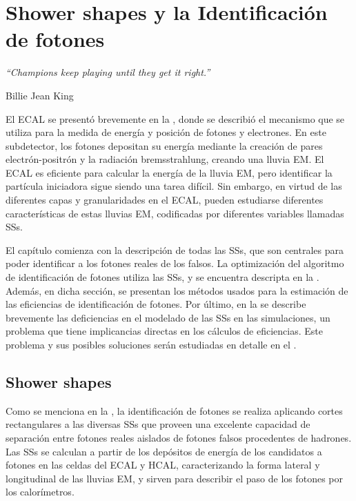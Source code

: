 \chapter{Shower shapes y la Identificaci\'on de fotones}
\label{ch:pid_ss}
\epigraph{\emph{“Champions keep playing until they get it right.”}}{Billie Jean King}



El \ac{ECAL} se presentó brevemente en la \Sect{\ref{subsubsec:atlas:atlas:cals:ecal}}, donde se describió el mecanismo que se utiliza para la medida de energ\'ia y posici\'on de fotones y electrones. En este subdetector, los fotones depositan su energía mediante la creación de pares electrón-positrón y la radiación bremsstrahlung, creando una lluvia \acf{EM}. El \ac{ECAL} es eficiente para calcular la energía de la lluvia \ac{EM}, pero identificar la partícula iniciadora sigue siendo una tarea difícil.
Sin embargo, en virtud de las diferentes capas y granularidades en el \ac{ECAL}, pueden estudiarse diferentes características de estas lluvias \ac{EM}, codificadas por diferentes variables llamadas \acfp{SS}.

El cap\'itulo comienza con la descripci\'on de todas las \acp{SS}, que son centrales para poder identificar a los fotones reales de los falsos.
La optimizaci\'on del algoritmo de identificaci\'on de fotones utiliza las \acp{SS}, y se encuentra descripta en la \Sect{\ref{sec:pid_ss:pid}}. Adem\'as, en dicha secci\'on, se presentan los m\'etodos usados para la estimaci\'on de las eficiencias de identificaci\'on de fotones.
Por último, en la \Sect{\ref{sec:pid_ss:ss_differences}} se describe brevemente las deficiencias en el modelado de las \acp{SS} en las simulaciones, un problema que tiene implicancias directas en los c\'alculos de eficiencias. Este problema y sus posibles soluciones ser\'an estudiadas en detalle en el \Ch{\ref{ch:ss_corrections}}.






\section{Shower shapes}
\label{sec:pid_ss:ss}

Como se menciona en la \Sect{\ref{subsec:objects:egamma:id}}, la identificación de fotones se realiza aplicando cortes rectangulares a las diversas \acp{SS} que proveen una excelente capacidad de separación entre fotones reales aislados de fotones falsos procedentes de hadrones. Las \acp{SS} se calculan a partir de los depósitos de energía de los candidatos a fotones en las celdas del \ac{ECAL} y \ac{HCAL}, caracterizando la forma lateral y longitudinal de las lluvias \ac{EM}, y sirven para describir el paso de los fotones por los calorímetros.

